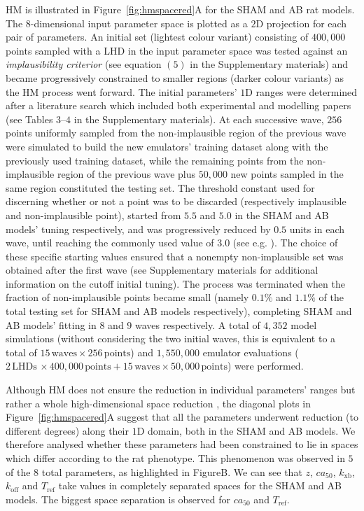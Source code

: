 \vspace{0.2cm}
HM is illustrated in Figure~\ref{fig:hmspacered}A for the SHAM and AB rat models. The $8$-dimensional input parameter space is plotted as a $2$D projection for each pair of parameters. An initial set (lightest colour variant) consisting of $400,000$ points sampled with a LHD in the input parameter space was tested against an \textit{implausibility criterior} (see equation $(5)$ in the Supplementary materials) and became progressively constrained to smaller regions (darker colour variants) as the HM process went forward. The initial parameters' $1$D ranges were determined after a literature search which included both experimental and modelling papers (see Tables $3$--$4$ in the Supplementary materials). At each successive wave, $256$ points uniformly sampled from the non-implausible region of the previous wave were simulated to build the new emulators' training dataset along with the previously used training dataset, while the remaining points from the non-implausible region of the previous wave plus $50,000$ new points sampled in the same region constituted the testing set. The threshold constant used for discerning whether or not a point was to be discarded (respectively implausible and non-implausible point), started from $5.5$ and $5.0$ in the SHAM and AB models' tuning respectively, and was progressively reduced by $0.5$ units in each wave, until reaching the commonly used value of $3.0$ (see e.g. \cite{Vernon:2010}). The choice of these specific starting values ensured that a nonempty non-implausible set was obtained after the first wave (see Supplementary materials for additional information on the cutoff initial tuning). The process was terminated when the fraction of non-implausible points became small (namely $0.1\%$ and $1.1\%$ of the total testing set for SHAM and AB models respectively), completing SHAM and AB models' fitting in $8$ and $9$ waves respectively. A total of $4,352$ model simulations (without considering the two initial waves, this is equivalent to a total of $15\,\text{waves}\times 256\,\text{points}$) and $1,550,000$ emulator evaluations ($2\,\text{LHDs}\,\times 400,000\,\text{points}+15\,\text{waves}\times 50,000\,\text{points}$) were performed.

\vspace{0.2cm}
Although HM does not ensure the reduction in individual parameters' ranges but rather a whole high-dimensional space reduction \cite{Coveney:2018}, the diagonal plots in Figure~\ref{fig:hmspacered}A suggest that all the parameters underwent reduction (to different degrees) along their $1$D domain, both in the SHAM and AB models. We therefore analysed whether these parameters had been constrained to lie in spaces which differ according to the rat phenotype. This phenomenon was observed in $5$ of the $8$ total parameters, as highlighted in FigureB. We can see that $z$, $ca_{50}$, $k_{\textrm{xb}}$, $k_{\textrm{off}}$ and $T_{\textrm{ref}}$ take values in completely separated spaces for the SHAM and AB models. The biggest space separation is observed for $ca_{50}$ and $T_{\textrm{ref}}$.

